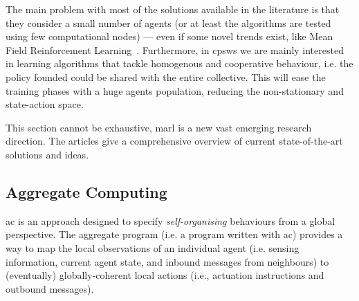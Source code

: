 \documentclass[11pt]{article}
\begin{document}
%
 
The main problem with most of the solutions available in the literature is that they consider a small number of agents (or at least the algorithms are tested using few computational nodes) --- even if some novel trends exist, like Mean Field Reinforcement Learning~\cite{DBLP:journals/corr/abs-2108-02731}.
%
Furthermore, in \acp{cpsw} we are mainly interested in learning algorithms that tackle homogenous and cooperative behaviour, i.e. the policy founded could be shared with the entire collective. 
%
This will ease the training phases with a huge agents population, reducing the non-stationary and state-action space.

This section cannot be exhaustive, \ac{marl} is a new vast emerging research direction. 
%
The articles \cite{DBLP:journals/aamas/Hernandez-LealK19, DBLP:journals/corr/abs-1911-10635, DBLP:journals/corr/abs-1908-03963} give a comprehensive overview of current state-of-the-art solutions and ideas.
\subsection{Aggregate Computing}

\ac{ac} is an approach designed to specify \emph{self-organising} behaviours from a global perspective.
%
The aggregate program (i.e. a program written with \ac{ac}) provides a way to map the local observations of an individual agent (i.e. sensing information, current agent state, and inbound messages from neighbours) to (eventually) globally-coherent local actions
 (i.e., actuation instructions and outbound messages).
%
\end{document}
